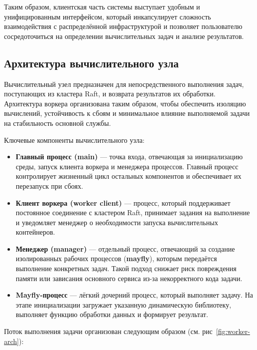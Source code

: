 Таким образом, клиентская часть системы выступает удобным
и унифицированным интерфейсом, который инкапсулирует сложность
взаимодействия с распределённой инфраструктурой и позволяет
пользователю сосредоточиться на определении вычислительных задач
и анализе результатов.

\subsection{Архитектура вычислительного узла}

Вычислительный узел предназначен для непосредственного выполнения задач,
поступающих из кластера Raft, и возврата результатов их обработки. Архитектура
воркера организована таким образом, чтобы обеспечить изоляцию вычислений,
устойчивость к сбоям и минимальное влияние выполняемой задачи на стабильность
основной службы.

Ключевые компоненты вычислительного узла:
\begin{itemize}
    \item \textbf{Главный процесс (main)} — точка входа, отвечающая за
    инициализацию среды, запуск клиента воркера и менеджера процессов. Главный
    процесс контролирует жизненный цикл остальных компонентов и обеспечивает их
    перезапуск при сбоях.
    \item \textbf{Клиент воркера (worker client)} — процесс, который
    поддерживает постоянное соединение с кластером Raft, принимает задания на
    выполнение и уведомляет менеджер о необходимости запуска вычислительных
    контейнеров.
    \item \textbf{Менеджер (manager)} — отдельный процесс, отвечающий за
    создание изолированных рабочих процессов (\textbf{mayfly}), которым
    передаётся выполнение конкретных задач. Такой подход снижает риск
    повреждения памяти или зависания основного сервиса из-за некорректного кода
    задачи.
    \item \textbf{Mayfly-процесс} — лёгкий дочерний процесс, который выполняет
    задачу. На этапе инициализации загружает указанную динамическую библиотеку,
    выполняет функцию обработки данных и формирует результат.
\end{itemize}

Поток выполнения задачи организован следующим образом (см.
рис~\ref{fig:worker-arch}):

